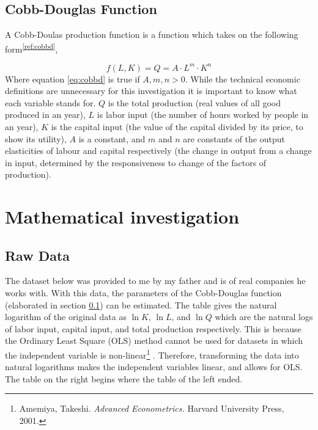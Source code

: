 \documentclass[a4paper,12pt]{article}
\theoremstyle{definition}
\begin{document}
\subsection{Cobb-Douglas Function}\label{sec:cobbd}
A Cobb-Doulas production function is a function which takes on the following form\textsuperscript{\ref{ref:cobbd}},

\begin{equation}\label{eq:cobbd}
		f(L,K)=Q=A \cdot L^m \cdot K^n
\end{equation}
Where equation \eqref{eq:cobbd} is true if $A,m,n>0$. While the technical economic definitions are unnecessary for this investigation it is important to know what each variable stands for. $Q$ is the total production (real values of all good produced in an year), $L$ is labor input (the number of hours worked by people in an year),  $K$ is the capital input (the value of the capital divided by its price, to show its utility),  $A$ is a constant, and $m$ and $n$ are constants of the output elasticities of labour and capital respectively (the change in output from a change in input, determined by the responsiveness to change of the factors of production).

\section{Mathematical investigation}
\subsection{Raw Data}
The dataset below was provided to me by my father and is of real companies he works with. With this data, the parameters of the Cobb-Douglas function (elaborated in section \ref{sec:cobbd}) can be estimated. The table gives the natural logarithm of the original data as $\ln K$, $\ln L$, and $\ln Q$ which are the natural logs of labor input, capital input, and total production respectively. This is because the Ordinary Least Square (OLS) method cannot be used for datasets in which the independent variable is non-linear\footnote{Amemiya, Takeshi. \textit{Advanced Econometrics.} Harvard University Press, 2001.} . Therefore, transforming the data into natural logarithms makes the independent variables linear, and allows for OLS. The table on the right begins where the table of the left ended.
\end{document}

